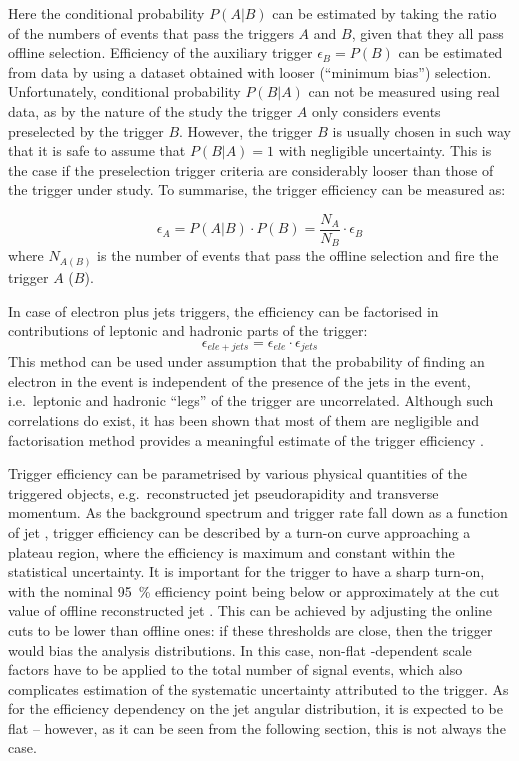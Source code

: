 Here the conditional probability $P(A|B)$ can be estimated by taking the ratio of the numbers of events that pass the
triggers $A$ and $B$, given that they all pass offline selection. Efficiency of the auxiliary trigger $\epsilon_{B} =
P(B)$ can be estimated from data by using a dataset obtained with looser (``minimum bias'') selection. Unfortunately,
conditional probability $P(B|A)$ can not be measured using real data, as by the nature of the study the trigger $A$ only
considers events preselected by the trigger $B$. However, the trigger $B$ is usually chosen in such way that it is safe
to assume that $P(B|A) = 1$ with negligible uncertainty. This is the case if the preselection trigger criteria are
considerably looser than those of the trigger under study. To summarise, the trigger efficiency can be measured as:

\begin{equation}
\epsilon_{A} = P(A|B) \cdot P(B) = \frac{N_A}{N_B} \cdot \epsilon_{B}
\end{equation}
where $N_{A (B)}$ is the number of events that pass the offline selection and fire the trigger $A$ ($B$).


In case of electron plus jets triggers, the efficiency can be factorised in contributions of leptonic and hadronic parts
of the trigger:
\begin{equation}
\epsilon_{ele+jets} = \epsilon_{ele} \cdot \epsilon_{jets}
\end{equation}
This method can be used under assumption that the probability of finding an electron in the event is independent of the
presence of the jets in the event, i.e.\ leptonic and hadronic ``legs'' of the trigger are uncorrelated. Although
such correlations do exist, it has been shown that most of them are negligible and factorisation method provides a
meaningful estimate of the trigger efficiency \cite{d0_note_top_trigger_efficiency}.

Trigger efficiency can be parametrised by various physical quantities of the triggered objects, e.g.\ reconstructed jet
pseudorapidity and transverse momentum. As the background spectrum and trigger rate fall down as a function of jet \pt,
trigger efficiency can be described by a turn-on curve approaching a plateau region, where the efficiency is maximum and
constant within the statistical uncertainty. It is important for the trigger to have a sharp turn-on, with the nominal
\SI{95}{\percent} efficiency point being below or approximately at the cut value of offline reconstructed jet \pt. This
can be achieved by adjusting the online cuts to be lower than offline ones: if these thresholds are close, then the
trigger would bias the analysis distributions. In this case, non-flat \pt-dependent scale factors have to be applied to
the total number of signal events, which also complicates estimation of the systematic uncertainty attributed to the
trigger. As for the efficiency dependency on the jet angular distribution, it is expected to be flat -- however, as it
can be seen from the following section, this is not always the case.

